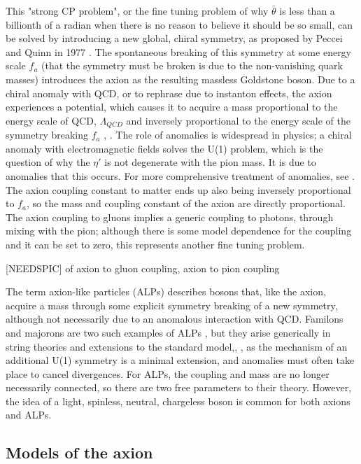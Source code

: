 \documentclass[12pt,twosides]{book}
\begin{document}
 This "strong CP problem", or the fine tuning problem of why $\bar \theta$ is less than a billionth of a radian when there is no reason to believe it should be so small, can be solved by introducing a new global, chiral symmetry, as proposed by Peccei and Quinn in 1977 \cite{peccei77}. The spontaneous breaking of this symmetry at some energy scale $f_a$ (that the symmetry must be broken is due to the non-vanishing quark masses) introduces the axion as the resulting massless Goldstone boson. Due to a chiral anomaly with QCD, or to rephrase due to instanton effects, the axion experiences a potential, which causes it to acquire a mass proportional to the energy scale of QCD, $\Lambda_{QCD}$ and inversely proportional to the energy scale of the symmetry breaking $f_a$ \cite{weinberg78}, \cite{wilczek78}. The role of anomalies is widespread in physics; a chiral anomaly with electromagnetic fields solves the U(1) problem, which is the question of why the $\eta'$ is not degenerate with the pion mass. It is due to anomalies that this occurs. For more comprehensive treatment of anomalies, see \cite{bardeen07}. The axion coupling constant to matter ends up also being inversely proportional to $f_a$, so the mass and coupling constant of the axion are directly proportional. The axion coupling to gluons implies a generic coupling to photons, through mixing with the pion; although there is some model dependence for the coupling and it can be set to zero, this represents another fine tuning problem.

[NEEDSPIC] of axion to gluon coupling, axion to pion coupling

The term axion-like particles (ALPs) describes bosons that, like the axion, acquire a mass through some explicit symmetry breaking of a new symmetry, although not necessarily due to an anomalous interaction with QCD. Familons and majorons are two such examples of ALPs \cite{kim87}, but they arise generically in string theories  and extensions to the standard model,\cite{masso06}, \cite{hewett12}, \cite{arias12} as the mechanism of an additional U(1) symmetry is a minimal extension, and anomalies must often take place to cancel divergences. For ALPs, the coupling and mass are no longer necessarily connected, so there are two free parameters to their theory. However, the idea of a light, spinless, neutral, chargeless boson is common for both axions and ALPs.

\subsection{Models of the axion}
\end{document}
